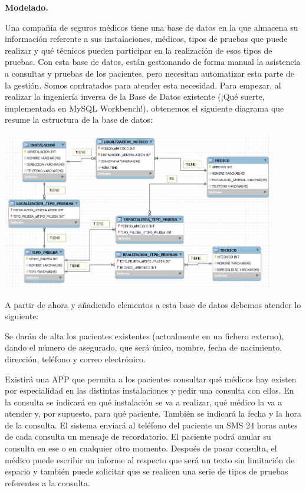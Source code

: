 \documentclass[
    12pt,
    a4paper,
    addpoints,
    answers,
    convocatoria=ord,
    titulacion=NoCD,
    curso=2023/2024,
]{db-exam}
\begin{document}
\begin{questions}

\question[2\half] \textbf{Modelado.}

Una compañía de seguros médicos tiene una base de datos en la que almacena su información referente a sus instalaciones, médicos, tipos de pruebas que puede realizar y qué técnicos pueden participar en la realización de esos tipos de pruebas. Con esta base de datos, están gestionando de forma manual la asistencia a consultas y pruebas de los pacientes, pero necesitan automatizar esta parte de la gestión. Somos contratados para atender esta necesidad. Para empezar, al realizar la ingeniería inversa de la Base de Datos existente (¡Qué suerte, implementada en MySQL Workbench!), obtenemos el siguiente diagrama que resume la estructura de la base de datos:

\begin{center}
\includegraphics[width=0.9\textwidth]{figs/bbdd-2023-2024-ordinaria/mer-enunciado.jpg}
\end{center}

A partir de ahora y añadiendo elementos a esta base de datos debemos atender lo siguiente: 

Se darán de alta los pacientes existentes (actualmente en un fichero externo), dando el número de asegurado, que será único, nombre, fecha de nacimiento, dirección, teléfono y correo electrónico. 

Existirá una APP que permita a los pacientes consultar qué médicos hay existen por especialidad en las distintas instalaciones y pedir una consulta con ellos. En la consulta se indicará en qué instalación se va a realizar, qué médico la va a atender y, por supuesto, para qué paciente. También se indicará la fecha y la hora de la consulta. El sistema enviará al teléfono del paciente un SMS 24 horas antes de cada consulta un mensaje de recordatorio. El paciente podrá anular su consulta en ese o en cualquier otro momento. Después de pasar consulta, el médico puede escribir un informe al respecto que será un texto sin limitación de espacio y también puede solicitar que se realicen una serie de tipos de pruebas referentes a la consulta.


\end{questions}
\end{document}
